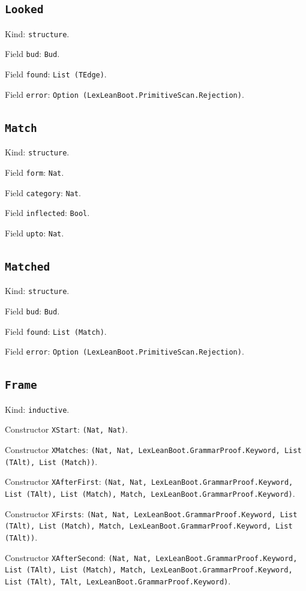 \documentclass[11pt]{article}
\begin{document}
\subsection*{\texttt{Looked}}
\noindent Kind: \texttt{structure}.\par
\noindent Field \texttt{bud}: \texttt{Bud}.\par
\noindent Field \texttt{found}: \texttt{List (TEdge)}.\par
\noindent Field \texttt{error}: \texttt{Option (LexLeanBoot.PrimitiveScan.Rejection)}.\par
\subsection*{\texttt{Match}}
\noindent Kind: \texttt{structure}.\par
\noindent Field \texttt{form}: \texttt{Nat}.\par
\noindent Field \texttt{category}: \texttt{Nat}.\par
\noindent Field \texttt{inflected}: \texttt{Bool}.\par
\noindent Field \texttt{upto}: \texttt{Nat}.\par
\subsection*{\texttt{Matched}}
\noindent Kind: \texttt{structure}.\par
\noindent Field \texttt{bud}: \texttt{Bud}.\par
\noindent Field \texttt{found}: \texttt{List (Match)}.\par
\noindent Field \texttt{error}: \texttt{Option (LexLeanBoot.PrimitiveScan.Rejection)}.\par
\subsection*{\texttt{Frame}}
\noindent Kind: \texttt{inductive}.\par
\noindent Constructor \texttt{XStart}: \texttt{(Nat, Nat)}.\par
\noindent Constructor \texttt{XMatches}: \texttt{(Nat, Nat, LexLeanBoot.GrammarProof.Keyword, List (TAlt), List (Match))}.\par
\noindent Constructor \texttt{XAfterFirst}: \texttt{(Nat, Nat, LexLeanBoot.GrammarProof.Keyword, List (TAlt), List (Match), Match, LexLeanBoot.GrammarProof.Keyword)}.\par
\noindent Constructor \texttt{XFirsts}: \texttt{(Nat, Nat, LexLeanBoot.GrammarProof.Keyword, List (TAlt), List (Match), Match, LexLeanBoot.GrammarProof.Keyword, List (TAlt))}.\par
\noindent Constructor \texttt{XAfterSecond}: \texttt{(Nat, Nat, LexLeanBoot.GrammarProof.Keyword, List (TAlt), List (Match), Match, LexLeanBoot.GrammarProof.Keyword, List (TAlt), TAlt, LexLeanBoot.GrammarProof.Keyword)}.\par
\end{document}
